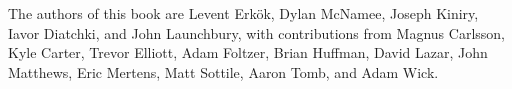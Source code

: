 The authors of this book are Levent {Erk\"{o}k}, Dylan McNamee, Joseph
Kiniry, Iavor Diatchki, and John Launchbury, with contributions from
Magnus Carlsson, Kyle Carter, Trevor Elliott, Adam Foltzer, Brian
Huffman, David Lazar, John Matthews, Eric Mertens, Matt Sottile, Aaron
Tomb, and Adam Wick.


